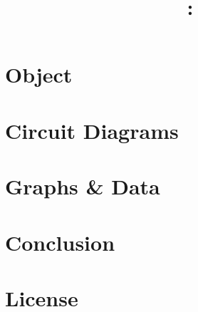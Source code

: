 \documentclass{article}
\title{\courseName\ \labNum: \\ \docTitle}
\author{\docAuthor}
\date{}
\begin{document}


\thispagestyle{empty}
\newpage
\mbox{}

\maketitle
\setcounter{page}{1} %
\tableofcontents %
\pagebreak

\newpage %
\section{Object}


\section{Circuit Diagrams}


\section{Graphs \& Data}


\section{Conclusion}


\newpage
\appendix

\section{License}

\end{document}

